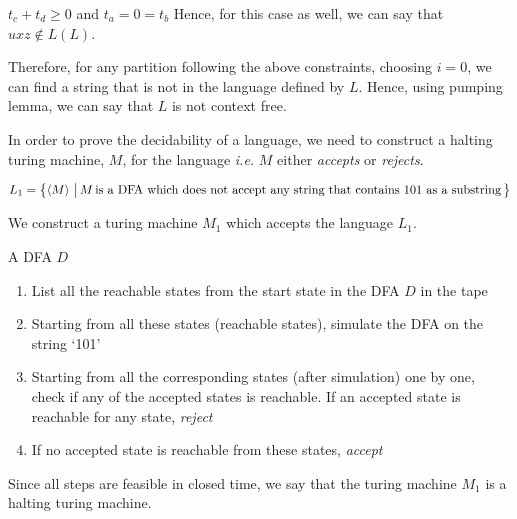 \documentclass{article}
\begin{document}
\begin{question}
\begin{qpart}{3}
\begin{qcase}{3}{$t_c + t_d \ge 0$ and $t_a = 0 = t_b$}
			Hence, for this case as well, we can say that $uxz \notin L(L)$.
			
		\end{qcase}

		Therefore, for any partition following the above constraints, choosing $i = 0$, we can find a string that is not in the language defined by $L$. Hence, using pumping lemma, we can say that $L$ is not context free.
		
	\end{qpart}

\end{question}

\begin{question}

	In order to prove the decidability of a language, we need to construct a halting turing machine, $M$, for the language \textit{i.e.} $M$ either \textit{accepts} or \textit{rejects}.

	\begin{qpart}{1}

		\begin{align*}
			L_1 = \left\{ \left\langle M \right\rangle \,\big|\, M \,\text{is a DFA which does not accept any string that contains 101 as a substring}\, \right\}
		\end{align*}

		We construct a turing machine $M_1$ which accepts the language $L_1$. \br%

		 \br%
		\begin{margin}
			 A DFA $D$

			\begin{enumerate}
				\item List all the reachable states from the start state in the DFA $D$ in the tape
				\item Starting from all these states (reachable states), simulate the DFA on the string `101'
				\item Starting from all the corresponding states (after simulation) one by one, check if any of the accepted states is reachable. If an accepted state is reachable for any state, \textit{reject}
				\item If no accepted state is reachable from these states, \textit{accept}
			\end{enumerate}
		\end{margin}

		Since all steps are feasible in closed time, we say that the turing machine $M_1$ is a halting turing machine. \br%


\end{qpart}
\end{question}
\end{document}
